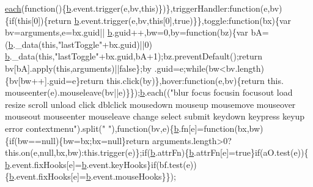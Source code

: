 \begin{DoxyCode}
      \hyperlink{jquery_8js_a871ff39db627c54c710a3e9909b8234c}{each}(\textcolor{keyword}{function}()\{\hyperlink{jquery_8js_aa4026ad5544b958e54ce5e106fa1c805}{b}.event.trigger(e,bv,\textcolor{keyword}{this})\})\},triggerHandler:\textcolor{keyword}{function}(e,bv)\{\textcolor{keywordflow}{if}(\textcolor{keyword}{this}[0])\{\textcolor{keywordflow}{return} 
      \hyperlink{jquery_8js_aa4026ad5544b958e54ce5e106fa1c805}{b}.event.trigger(e,bv,\textcolor{keyword}{this}[0],\textcolor{keyword}{true})\}\},toggle:\textcolor{keyword}{function}(bx)\{var bv=arguments,e=bx.guid||
      \hyperlink{jquery_8js_aa4026ad5544b958e54ce5e106fa1c805}{b}.guid++,bw=0,by=\textcolor{keyword}{function}(bz)\{var bA=(\hyperlink{jquery_8js_aa4026ad5544b958e54ce5e106fa1c805}{b}.\_data(\textcolor{keyword}{this},\textcolor{stringliteral}{"lastToggle"}+bx.guid)||0)%
      \hyperlink{jquery_8js_aa4026ad5544b958e54ce5e106fa1c805}{b}.\_data(\textcolor{keyword}{this},\textcolor{stringliteral}{"lastToggle"}+bx.guid,bA+1);bz.preventDefault();\textcolor{keywordflow}{return} bv[bA].apply(\textcolor{keyword}{this},arguments)||\textcolor{keyword}{false}\};by
      .guid=e;\textcolor{keywordflow}{while}(bw<bv.length)\{bv[bw++].guid=e\}\textcolor{keywordflow}{return} this.click(by)\},hover:\textcolor{keyword}{function}(e,bv)\{\textcolor{keywordflow}{return} this.
      mouseenter(e).mouseleave(bv||e)\}\});\hyperlink{jquery_8js_aa4026ad5544b958e54ce5e106fa1c805}{b}.each((\textcolor{stringliteral}{"blur focus focusin focusout load resize scroll unload click dblclick
       mousedown mouseup mousemove mouseover mouseout mouseenter mouseleave change select submit keydown keypress
       keyup error contextmenu"}).split(\textcolor{stringliteral}{" "}),\textcolor{keyword}{function}(bv,e)\{\hyperlink{jquery_8js_aa4026ad5544b958e54ce5e106fa1c805}{b}.fn[e]=\textcolor{keyword}{function}(bx,bw)\{\textcolor{keywordflow}{if}(bw==null)\{bw=bx;bx=null\}\textcolor{keywordflow}{return} 
      arguments.length>0?this.on(e,null,bx,bw):this.trigger(e)\};\textcolor{keywordflow}{if}(\hyperlink{jquery_8js_aa4026ad5544b958e54ce5e106fa1c805}{b}.attrFn)\{\hyperlink{jquery_8js_aa4026ad5544b958e54ce5e106fa1c805}{b}.attrFn[e]=\textcolor{keyword}{true}\}\textcolor{keywordflow}{if}(aO.test(e))\{
      \hyperlink{jquery_8js_aa4026ad5544b958e54ce5e106fa1c805}{b}.event.fixHooks[e]=\hyperlink{jquery_8js_aa4026ad5544b958e54ce5e106fa1c805}{b}.event.keyHooks\}\textcolor{keywordflow}{if}(bf.test(e))\{\hyperlink{jquery_8js_aa4026ad5544b958e54ce5e106fa1c805}{b}.event.fixHooks[e]=\hyperlink{jquery_8js_aa4026ad5544b958e54ce5e106fa1c805}{b}.event.mouseHooks\}\});

\end{DoxyCode}
